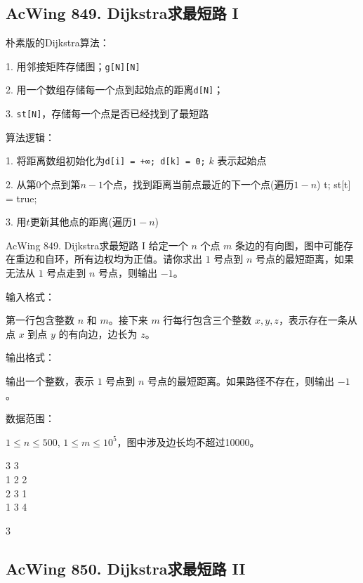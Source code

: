 \subsection{AcWing 849. Dijkstra求最短路 I}

朴素版的Dijkstra算法：

1. 用邻接矩阵存储图；\lstinline{g[N][N]}

2. 用一个数组存储每一个点到起始点的距离\lstinline{d[N]}；

3. \lstinline{st[N]}，存储每一个点是否已经找到了最短路

算法逻辑：

1. 将距离数组初始化为\lstinline{d[i] = +∞; d[k] = 0;} $k$ 表示起始点

2. 从第$0$个点到第$n - 1$个点，找到距离当前点最近的下一个点(遍历$1 - n$) \lstinline{}{t; st[t] = true;}

3. 用$t$更新其他点的距离(遍历$1 - n$)


\begin{titledbox}{AcWing 849. Dijkstra求最短路 I}
    给定一个 $n$ 个点 $m$ 条边的有向图，图中可能存在重边和自环，所有边权均为正值。请你求出 $1$ 号点到 $n$ 号点的最短距离，如果无法从 $1$ 号点走到 $n$ 号点，则输出 $-1$。

    输入格式：

    第一行包含整数 $n$ 和 $m$。接下来 $m$ 行每行包含三个整数 $x,y,z$，表示存在一条从点 $x$ 到点 $y$ 的有向边，边长为 $z$。

    输出格式：

    输出一个整数，表示 $1$ 号点到 $n$ 号点的最短距离。如果路径不存在，则输出 $-1$。

    数据范围：

    $1 \le n \le 500$, $1 \le m \le 10^5$，图中涉及边长均不超过10000。

    \begin{inputblock}
        3 3 \\
        1 2 2 \\
        2 3 1 \\
        1 3 4
    \end{inputblock}
    \begin{outputblock}
        3
    \end{outputblock}
\end{titledbox}

\subsection{AcWing 850. Dijkstra求最短路 II}

